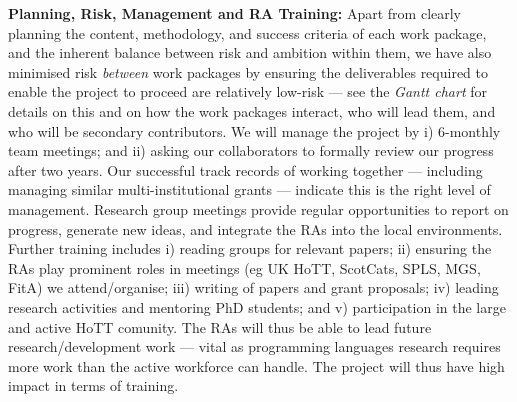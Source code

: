 \documentclass[a4paper,11pt]{article}
\begin{document}
{\bf Planning, Risk, Management and RA Training:} Apart from clearly
planning the content, methodology, and success criteria of each work
package, and the inherent balance between risk and ambition within
them, we have also minimised risk {\em between} work packages by
ensuring the deliverables required to enable the project to proceed
are relatively low-risk --- see the {\em Gantt chart} for details on
this and on how the work packages interact, who will lead them, and
who will be secondary contributors. We will manage the project by i)
6-monthly team meetings; and ii) asking our collaborators to formally
review our progress after two years.  Our successful
track records of working together --- including managing similar
multi-institutional grants --- indicate this is the right level of
management. Research group meetings provide regular opportunities to
report on progress, generate new ideas, and integrate the RAs into the
local environments. Further training includes i) reading groups for
relevant papers; ii) ensuring the RAs play prominent roles in meetings
(eg UK HoTT, ScotCats, SPLS, MGS, FitA) we attend/organise; iii)
writing of papers and grant proposals; iv) leading research activities
and mentoring PhD students; and v) participation in the large and
active HoTT comunity. The RAs will thus be able to lead future
research/development work --- vital as programming languages research
requires more work than the active workforce can handle. The
project will thus have high impact in terms of training.







\begin{footnotesize}
\begin{multicols}{2}

%
%

\end{multicols}
\end{footnotesize}

% 
% 
\end{document}
